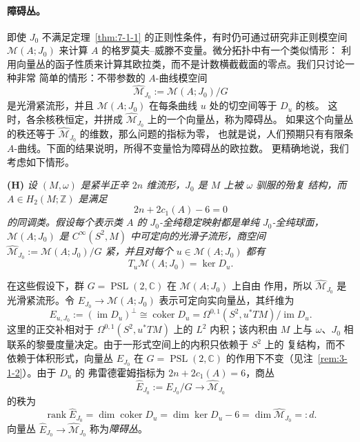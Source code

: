 \paragraph{障碍丛。}
即使 $J_0$ 不满足定理~\ref{thm:7-1-1} 的正则性条件，有时仍可通过研究非正则模空间
$\mathcal M(A;J_0)$ 来计算 $A$ 的格罗莫夫--威滕不变量。微分拓扑中有一个类似情形：
利用向量丛的函子性质来计算其欧拉类，而不是计数横截截面的零点。我们只讨论一种非常
简单的情形：不带参数的 $A$-曲线模空间
\[
  \widehat{\mathcal M}_{J_0}:=\mathcal M(A;J_0)/G
\]
是光滑紧流形，并且 $\mathcal M(A;J_0)$ 在每条曲线 $u$ 处的切空间等于 $D_u$ 的核。
这时，各余核秩恒定，并拼成 $\widehat{\mathcal M}_{J_0}$ 上的一个向量丛，称为障碍丛。
如果这个向量丛的秩还等于 $\widehat{\mathcal M}_{J_0}$ 的维数，那么问题的指标为零，
也就是说，人们预期只有有限条 $A$-曲线。下面的结果说明，所得不变量恰为障碍丛的欧拉数。
更精确地说，我们考虑如下情形。

\medskip
\noindent\textbf{(H)}
\emph{设 $(M,\omega)$ 是紧半正辛 $2n$ 维流形，$J_0$ 是 $M$ 上被 $\omega$ 驯服的殆复
结构，而 $A\in H_2(M;\mathbb Z)$ 是满足
\[
  2n+2c_1(A)-6=0
\]
的同调类。假设每个表示类 $A$ 的 $J_0$-全纯稳定映射都是单纯 $J_0$-全纯球面，
$\mathcal M(A;J_0)$ 是 $C^\infty(S^2,M)$ 中可定向的光滑子流形，商空间
$\widehat{\mathcal M}_{J_0}:=\mathcal M(A;J_0)/G$ 紧，并且对每个
$u\in\mathcal M(A;J_0)$ 都有
\[
  T_u\mathcal M(A;J_0)=\ker D_u.
\]}

在这些假设下，群 $G=\operatorname{PSL}(2,\mathbb C)$ 在 $\mathcal M(A;J_0)$ 上自由
作用，所以 $\widehat{\mathcal M}_{J_0}$ 是光滑紧流形。令
$E_{J_0}\to\mathcal M(A;J_0)$ 表示可定向实向量丛，其纤维为
\begin{equation}\label{eq:7-2-1}
  E_{u,J_0}:=(\operatorname{im}D_u)^\perp
  \cong\operatorname{coker}D_u
  =\Omega^{0,1}(S^2,u^*TM)/\operatorname{im}D_u.
\end{equation}
这里的正交补相对于 $\Omega^{0,1}(S^2,u^*TM)$ 上的 $L^2$ 内积；该内积由 $M$ 上与
$\omega$、$J_0$ 相联系的黎曼度量决定。由于一形式空间上的内积只依赖于 $S^2$ 上的
复结构，而不依赖于体积形式，向量丛 $E_{J_0}$ 在
$G=\operatorname{PSL}(2,\mathbb C)$ 的作用下不变（见注~\ref{rem:3-1-2}）。由于 $D_u$ 的
弗雷德霍姆指标为 $2n+2c_1(A)=6$，商丛
\[
  \widehat E_{J_0}:=E_{J_0}/G\longrightarrow\widehat{\mathcal M}_{J_0}
\]
的秩为
\[
  \operatorname{rank}\widehat E_{J_0}
  =\dim\operatorname{coker}D_u
  =\dim\ker D_u-6
  =\dim\widehat{\mathcal M}_{J_0}=:d.
\]
向量丛 $\widehat E_{J_0}\to\widehat{\mathcal M}_{J_0}$ 称为\emph{障碍丛}。

